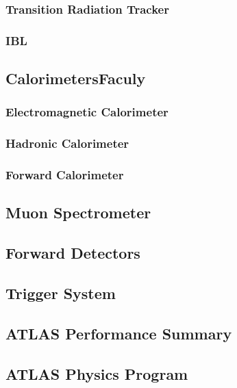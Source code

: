 \subsubsection*{Transition Radiation Tracker}



\subsubsection*{IBL}


\subsection{CalorimetersFaculy}

\subsubsection*{Electromagnetic Calorimeter}


\subsubsection*{Hadronic Calorimeter}


\subsubsection*{Forward Calorimeter}


\subsection{Muon Spectrometer}


\subsection{Forward Detectors}

\subsection{Trigger System}
\label{sec:cern:trigger}

\subsection{ATLAS Performance Summary}


\subsection{ATLAS Physics Program}